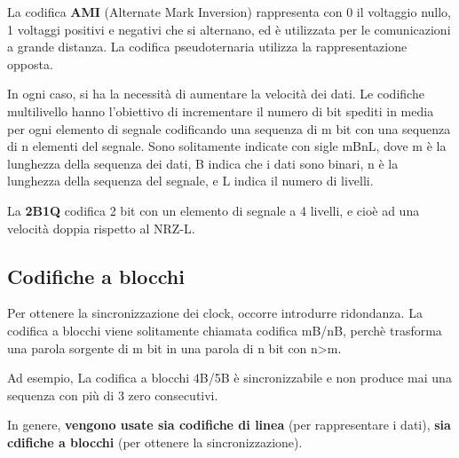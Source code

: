 \vspace{3mm}

La codifica \textbf{AMI} (Alternate Mark Inversion) rappresenta con 0 il voltaggio nullo, 1 voltaggi positivi e negativi che si alternano, ed è utilizzata per le comunicazioni a grande distanza. La codifica pseudoternaria utilizza la rappresentazione opposta.

\vspace{3mm}

In ogni caso, si ha la necessità di aumentare la velocità dei dati. Le codifiche multilivello hanno l'obiettivo di incrementare il numero di bit spediti in media per ogni elemento di segnale codificando una sequenza di m bit con una sequenza di n elementi del segnale. Sono solitamente indicate con sigle mBnL, dove m è la lunghezza della sequenza dei dati, B indica che i dati sono binari, n è la lunghezza della sequenza del segnale, e L indica il numero di livelli.

La \textbf{2B1Q} codifica 2 bit con un elemento di segnale a 4 livelli, e cioè ad una velocità doppia rispetto al NRZ-L.

\subsection{Codifiche a blocchi}

Per ottenere la sincronizzazione dei clock, occorre introdurre ridondanza. La codifica a blocchi viene solitamente chiamata codifica mB/nB, perchè trasforma una parola sorgente di m bit in una parola di n bit con n>m. 

Ad esempio, La codifica a blocchi 4B/5B è sincronizzabile e non produce mai una sequenza con più di 3 zero consecutivi.

\vspace{3mm}

In genere, \textbf{vengono usate sia codifiche di linea} (per rappresentare i dati), \textbf{sia cdifiche a blocchi} (per ottenere la sincronizzazione).